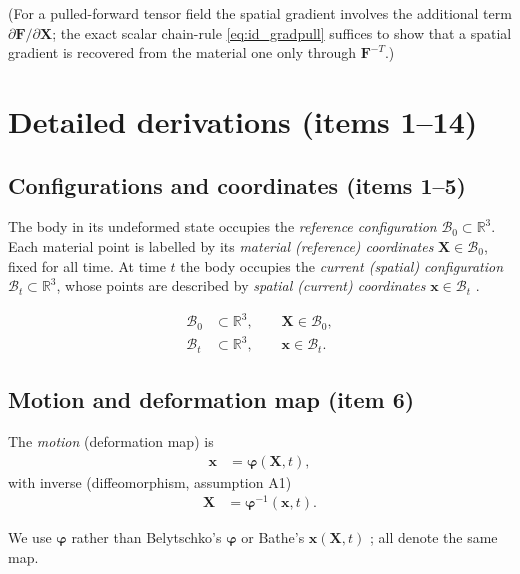 \documentclass[11pt]{article}
\newcommand{\bX}{\mathbf{X}}
\newcommand{\bx}{\mathbf{x}}
\newcommand{\bp}{\boldsymbol{\varphi}}
\newcommand{\bF}{\mathbf{F}}
\newcommand{\bX}{\mathbf{X}}
\newcommand{\bx}{\mathbf{x}}
\newcommand{\bp}{\boldsymbol{\varphi}}
\newcommand{\bphi}{\boldsymbol{\varphi}}
\newcommand{\bF}{\mathbf{F}}
\begin{document}
\noindent (For a pulled-forward tensor field the spatial gradient involves
the additional term $\partial\bF/\partial\bX$; the exact scalar
chain-rule \eqref{eq:id_gradpull} suffices to show that a spatial
gradient is recovered from the material one only through
$\bF^{-T}$.)

\section{Detailed derivations (items 1--14)}
\label{sec:kinematics}

\subsection{Configurations and coordinates (items 1--5)}
The body in its undeformed state occupies the \emph{reference
configuration} $\mathcal{B}_{0}\subset\mathbb{R}^{3}$. Each material
point is labelled by its \emph{material (reference) coordinates}
$\bX\in\mathcal{B}_{0}$, fixed for all time. At time $t$ the body
occupies the \emph{current (spatial) configuration}
$\mathcal{B}_{t}\subset\mathbb{R}^{3}$, whose points are described by
\emph{spatial (current) coordinates} $\bx\in\mathcal{B}_{t}$
\cite{Holzapfel2000,BonetWood2008}.

\begin{align}
\mathcal{B}_{0} &\subset \mathbb{R}^{3},\qquad \bX\in\mathcal{B}_{0},
\label{eq:n_ref}\\
\mathcal{B}_{t} &\subset \mathbb{R}^{3},\qquad \bx\in\mathcal{B}_{t}.
\label{eq:n_cur}
\end{align}

\subsection{Motion and deformation map (item 6)}
The \emph{motion} (deformation map) is
\begin{align}
\bx &= \bp(\bX,t),
\label{eq:n_motion}
\end{align}
with inverse (diffeomorphism, assumption A1)
\begin{align}
\bX &= \bp^{-1}(\bx,t).
\label{eq:n_inv}
\end{align}

We use $\bp$ \cite{BonetWood2008,Holzapfel2000,SimoHughes1998} rather
than Belytschko's $\bphi$ \cite{Belytschko2000} or Bathe's
$\bx(\bX,t)$ \cite{Bathe2006}; all denote the same map.
\end{document}
